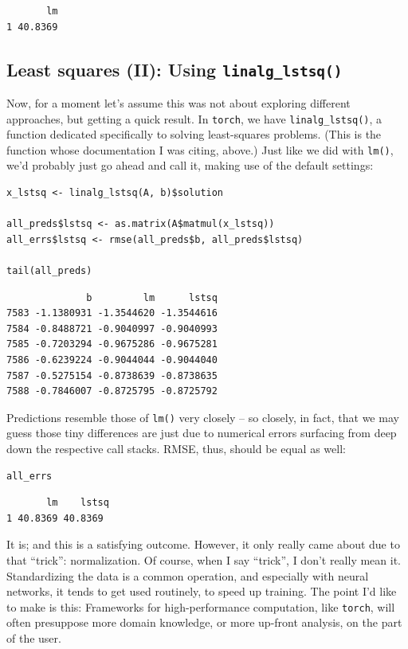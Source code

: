 \documentclass[
  letterpaper,
]{krantz}
\begin{document}
\begin{verbatim}
       lm
1 40.8369
\end{verbatim}

\hypertarget{least-squares-ii-using-linalg_lstsq}{%
\subsection{\texorpdfstring{Least squares (II): Using
\texttt{linalg\_lstsq()}}{Least squares (II): Using linalg\_lstsq()}}\label{least-squares-ii-using-linalg_lstsq}}

Now, for a moment let's assume this was not about exploring different
approaches, but getting a quick result. In \texttt{torch}, we have
\texttt{linalg\_lstsq()}, a function dedicated specifically to solving
least-squares problems. (This is the function whose documentation I was
citing, above.) Just like we did with \texttt{lm()}, we'd probably just
go ahead and call it, making use of the default settings:

\begin{verbatim}
x_lstsq <- linalg_lstsq(A, b)$solution

all_preds$lstsq <- as.matrix(A$matmul(x_lstsq))
all_errs$lstsq <- rmse(all_preds$b, all_preds$lstsq)

tail(all_preds)
\end{verbatim}

\begin{verbatim}
              b         lm      lstsq
7583 -1.1380931 -1.3544620 -1.3544616
7584 -0.8488721 -0.9040997 -0.9040993
7585 -0.7203294 -0.9675286 -0.9675281
7586 -0.6239224 -0.9044044 -0.9044040
7587 -0.5275154 -0.8738639 -0.8738635
7588 -0.7846007 -0.8725795 -0.8725792
\end{verbatim}

Predictions resemble those of \texttt{lm()} very closely -- so closely,
in fact, that we may guess those tiny differences are just due to
numerical errors surfacing from deep down the respective call stacks.
RMSE, thus, should be equal as well:

\begin{verbatim}
all_errs
\end{verbatim}

\begin{verbatim}
       lm    lstsq
1 40.8369 40.8369
\end{verbatim}

It is; and this is a satisfying outcome. However, it only really came
about due to that ``trick'': normalization. Of course, when I say
``trick'', I don't really mean it. Standardizing the data is a common
operation, and especially with neural networks, it tends to get used
routinely, to speed up training. The point I'd like to make is this:
Frameworks for high-performance computation, like \texttt{torch}, will
often presuppose more domain knowledge, or more up-front analysis, on
the part of the user.
\end{document}
